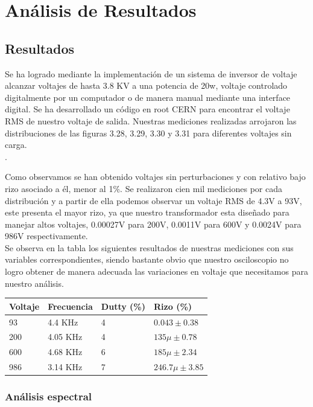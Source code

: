 \chapter{Análisis de Resultados}
\section{Resultados}

Se ha logrado mediante la implementación de un sistema de inversor de voltaje alcanzar voltajes de hasta 3.8 KV a una potencia de 20w, voltaje controlado digitalmente por un computador o de manera manual mediante una interface digital. Se ha desarrollado un código en root CERN para encontrar el voltaje RMS de nuestro voltaje de salida. Nuestras mediciones realizadas arrojaron las  distribuciones de las figuras 3.28, 3.29, 3.30 y 3.31 para diferentes voltajes sin carga. \\.


Como observamos se han obtenido voltajes sin perturbaciones y con relativo bajo rizo asociado a él, menor al 1$\%$. Se realizaron cien mil mediciones por cada distribución y a partir de ella podemos observar un voltaje RMS de 4.3V a 93V, este presenta el mayor rizo, ya que nuestro transformador esta diseñado para manejar altos voltajes, 0.00027V para 200V, 0.0011V para 600V y 0.0024V para 986V respectivamente. \\

Se observa en la tabla los siguientes resultados de nuestras mediciones con sus variables correspondientes, siendo bastante obvio que nuestro osciloscopio no logro obtener de manera adecuada las variaciones en voltaje que necesitamos para nuestro análisis. 

\begin{table}[H]
\begin{tabular}{@{}llll@{}}
\toprule
Voltaje   & Frecuencia & Dutty (\%) & Rizo (\%)\\ \midrule
93  & 4.4 KHz        & 4   & $0.043\pm 0.38$\\
200 & 4.05 KHz        & 4   &   $135\mu\pm 0.78$ \\
600 & 4.68 KHz        & 6   &   $185\mu\pm 2.34$ \\
986 & 3.14 KHz       & 7   &   $246.7 \mu \pm 3.85$ \\ \bottomrule
\end{tabular}
\end{table}


\subsection{Análisis espectral} 

